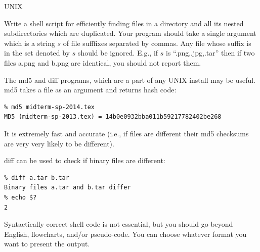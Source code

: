 \documentclass[11pt]{exam}
\begin{document}
\begin{questions}

\newpage

\question[10] UNIX

Write a shell script for efficiently finding files in a directory and all its nested subdirectories
which are duplicated. Your program
should take a single argument which is a string $s$ of file sufffixes
separated by commas. Any file whose suffix is in the set denoted by $s$ should
be ignored. E.g., if $s$ is ``.png,.jpg,.tar'' then if two files a.png and b.png 
are identical, you should not report them.

The md5 and diff programs, which are a part of any UNIX install may be useful. md5 takes
a file as an argument and returns hash code:
\begin{verbatim}
% md5 midterm-sp-2014.tex
MD5 (midterm-sp-2013.tex) = 14b0e0932bba011b59217782402be268
\end{verbatim}
It is extremely fast and accurate (i.e., if files are different their md5 checksums are very very likely
to be different).

diff can be used to check if binary files are different:
\begin{verbatim}
% diff a.tar b.tar
Binary files a.tar and b.tar differ
% echo $?
2
\end{verbatim}

Syntactically correct shell code is not essential, but you should go beyond English, flowcharts, 
and/or pseudo-code. You can choose whatever format you want to present the output.


\end{questions}
\end{document}
